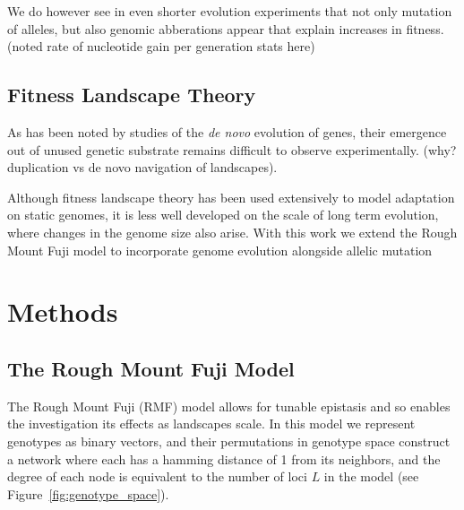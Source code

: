 \documentclass[paper=a4, fontsize=11pt,twoside]{scrartcl}       %
\begin{document}
We do however see in even shorter evolution experiments that not only mutation of alleles, but also genomic abberations appear that explain increases in fitness. (noted rate of nucleotide gain per generation stats here)
\subsection*{Fitness Landscape Theory}

As has been noted by studies of the \textit{de novo} evolution of genes, their emergence out of unused genetic substrate remains difficult to observe experimentally. (why? duplication vs de novo navigation of landscapes).

Although fitness landscape theory has been used extensively to model adaptation on static genomes, it is less well developed on the scale of long term evolution, where changes in the genome size also arise. With this work we extend the Rough Mount Fuji model to incorporate genome evolution alongside allelic mutation

\section*{Methods}

\subsection*{The Rough Mount Fuji Model}

The Rough Mount Fuji (RMF) model allows for tunable epistasis \cite{neidhartAdaptationTunablyRugged2014} and so enables the investigation its effects as landscapes scale. In this model we represent genotypes as binary vectors, and their permutations in genotype space construct a network where each has a hamming distance of 1 from its neighbors, and the degree of each node is equivalent to the number of loci $L$ in the model (see Figure~\ref{fig:genotype_space}).
\end{document}
